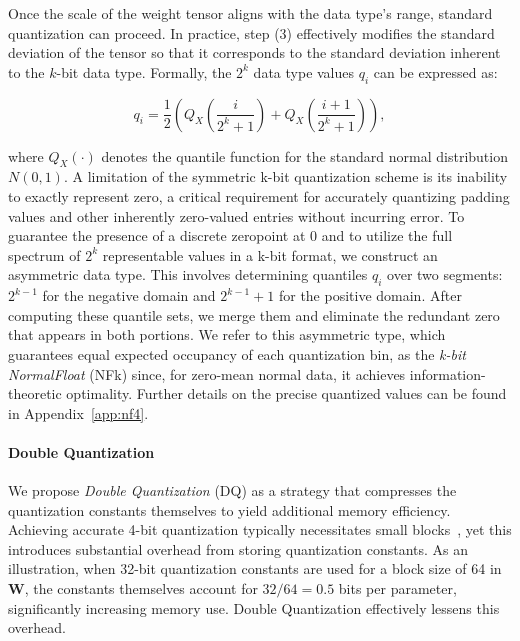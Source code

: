Once the scale of the weight tensor aligns with the data type's range, standard quantization can proceed. In practice, step (3) effectively modifies the standard deviation of the tensor so that it corresponds to the standard deviation inherent to the $k$-bit data type. Formally, the $2^k$ data type values $q_i$ can be expressed as:

\begin{equation}
q_i  = \frac{1}{2}\left( Q_X\left(\frac{i}{2^k+1}\right) + Q_X\left(\frac{i+1}{2^k+1}\right)\right),
\end{equation}

where $Q_X(\cdot)$ denotes the quantile function for the standard normal distribution $N(0,1)$. A limitation of the symmetric k-bit quantization scheme is its inability to exactly represent zero, a critical requirement for accurately quantizing padding values and other inherently zero-valued entries without incurring error. To guarantee the presence of a discrete zeropoint at $0$ and to utilize the full spectrum of $2^k$ representable values in a k-bit format, we construct an asymmetric data type. This involves determining quantiles $q_i$ over two segments: $2^{k-1}$ for the negative domain and $2^{k-1}+1$ for the positive domain. After computing these quantile sets, we merge them and eliminate the redundant zero that appears in both portions. We refer to this asymmetric type, which guarantees equal expected occupancy of each quantization bin, as the \emph{k-bit NormalFloat} (NFk) since, for zero-mean normal data, it achieves information-theoretic optimality. Further details on the precise quantized values can be found in Appendix~\ref{app:nf4}.

\paragraph{Double Quantization{}} 
We propose \emph{Double Quantization} (DQ) as a strategy that compresses the quantization constants themselves to yield additional memory efficiency. Achieving accurate 4-bit quantization typically necessitates small blocks~\citep{dettmers2022case}, yet this introduces substantial overhead from storing quantization constants. As an illustration, when 32-bit quantization constants are used for a block size of 64 in $\mathbf{W}$, the constants themselves account for $32/64 = 0.5$ bits per parameter, significantly increasing memory use. Double Quantization effectively lessens this overhead.

